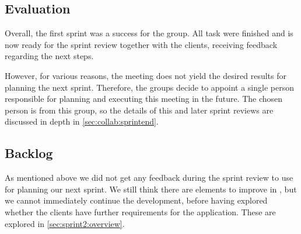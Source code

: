 \subsection{Evaluation}
Overall, the first sprint was a success for the group.
All task were finished and \launcher is now ready for the sprint review together with the clients, receiving feedback regarding the next steps.

However, for various reasons, the meeting does not yield the desired results for planning the next sprint.
Therefore, the groups decide to appoint a single person responsible for planning and executing this meeting in the future.
The chosen person is from this group, so the details of this and later sprint reviews are discussed in depth in \cref{sec:collab:sprintend}.

\subsection{Backlog}
As mentioned above we did not get any feedback during the sprint review to use for planning our next sprint.
We still think there are elements to improve in \launcher, but we cannot immediately continue the development, before having explored whether the clients have further requirements for the application.
These are explored in \cref{sec:sprint2:overview}.